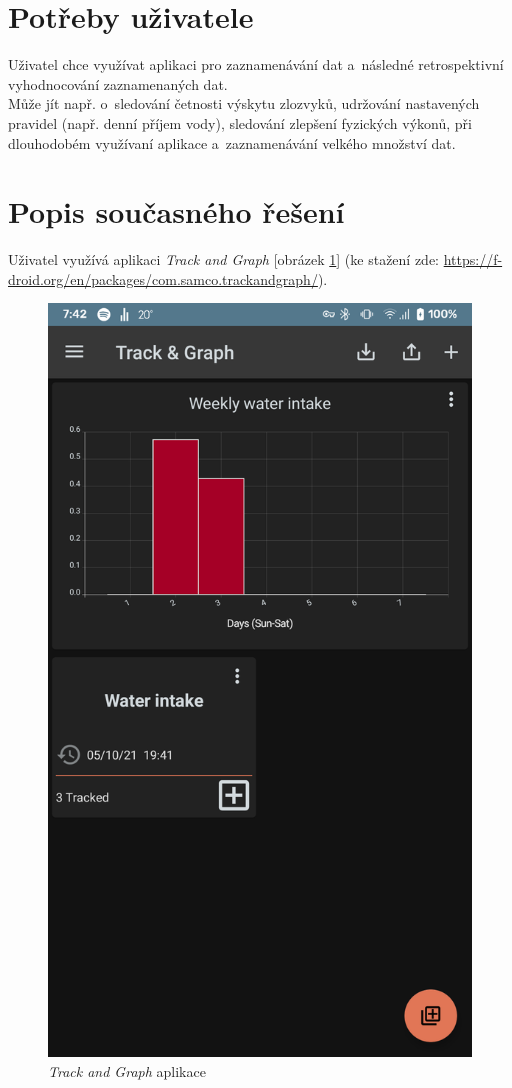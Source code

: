 \documentclass[12pt, titlepage]{article}
\begin{document}
\section{Potřeby uživatele}
Uživatel chce využívat aplikaci pro zaznamenávání dat a~následné retrospektivní vyhodnocování zaznamenaných dat.\\
Může jít např. o~sledování četnosti výskytu zlozvyků, udržování nastavených pravidel (např. denní příjem vody), sledování zlepšení fyzických výkonů,  při dlouhodobém využívaní aplikace a~zaznamenávání velkého množství dat.

\section{Popis současného řešení}
Uživatel využívá aplikaci \emph{Track and Graph} [obrázek \ref{fig:track-app}] (ke stažení zde: \url{https://f-droid.org/en/packages/com.samco.trackandgraph/}).
\begin{figure}[h]
	\centering
    	\includegraphics[scale=0.15]{trackgraph-pic}
    \caption{\emph{Track and Graph} aplikace}
    \label{fig:track-app}
\end{figure}
\end{document}
